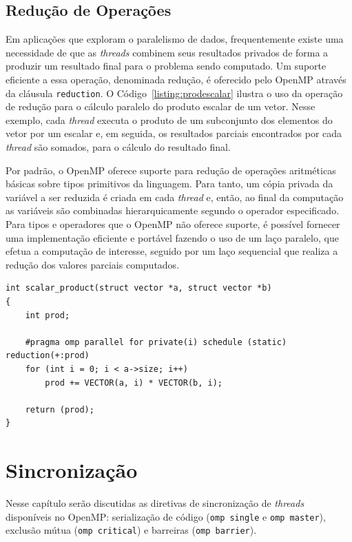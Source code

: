 \documentclass{SBCbookchapter}
\begin{document}
	\subsection{Redução de Operações}
	\label{subsection: reducao de operacoes}

		Em aplicações que exploram o paralelismo de dados,
		frequentemente existe uma necessidade de que as \textit{threads}
		combinem seus resultados privados de forma a produzir um
		resultado final para o problema sendo computado. Um suporte
		eficiente a essa operação, denominada redução, é oferecido pelo
		OpenMP através da cláusula \texttt{reduction}. O Código~\ref{listing:prodescalar}
		ilustra o uso da operação de redução para o cálculo
		paralelo do produto escalar de um vetor. Nesse exemplo, cada
		\textit{thread} executa o produto de um subconjunto dos
		elementos do vetor por um escalar e, em seguida, os resultados
		parciais encontrados por cada \textit{thread} são somados, para
		o cálculo do resultado final.

		Por padrão, o OpenMP oferece suporte  para redução de operações
		aritméticas básicas sobre tipos primitivos da linguagem. Para
		tanto, um cópia privada da variável a ser reduzida é criada em
		cada \textit{thread} e, então, ao final da computação as
		variáveis são combinadas hierarquicamente segundo o operador
		especificado. Para tipos e operadores que o OpenMP não oferece
		suporte, é possível fornecer uma implementação eficiente e
		portável fazendo o uso de um laço paralelo, que efetua a
		computação de interesse, seguido por um laço sequencial que
		realiza a redução dos valores parciais computados.

\begin{lstlisting}[frame=single, caption=Produto escalar.,
label=listing:prodescalar]
int scalar_product(struct vector *a, struct vector *b)
{
	int prod;

	#pragma omp parallel for private(i) schedule (static) reduction(+:prod)
	for (int i = 0; i < a->size; i++)
		prod += VECTOR(a, i) * VECTOR(b, i);
	
	return (prod);
}
\end{lstlisting}


\section{Sincronização}
\label{section: sincronizacao}

	Nesse capítulo serão discutidas as diretivas de sincronização de \textit{threads}
	disponíveis no OpenMP: serialização de código (\texttt{omp single} e
	\texttt{omp master}), exclusão mútua (\texttt{omp critical}) e barreiras
	(\texttt{omp barrier}).
\end{document}
